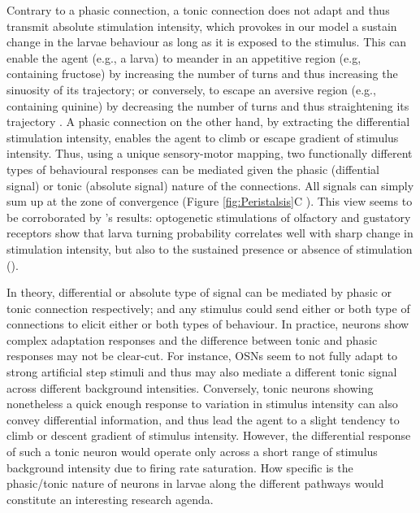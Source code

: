 \documentclass[11pt,a4paper]{article}
\begin{document}
Contrary to a phasic connection, a tonic connection does not adapt and thus transmit absolute stimulation intensity, which provokes in our model a sustain change in the larvae behaviour as long as it is exposed to the stimulus. This can enable the agent (e.g., a larva) to meander in an appetitive region (e.g, containing fructose) by increasing the number of turns and thus increasing the sinuosity of its trajectory; or conversely, to escape an aversive region (e.g., containing quinine) by decreasing the number of turns and thus straightening its trajectory \citep{benhamou1989animals}. A phasic connection on the other hand, by extracting the differential stimulation intensity, enables the agent to climb or escape gradient of stimulus intensity. Thus, using a unique sensory-motor mapping, two functionally different types of behavioural responses can be mediated given the phasic (diffential signal) or tonic (absolute signal) nature of the connections. All signals can simply sum up at the zone of convergence (Figure \ref{fig:Peristalsis}C ). This view seems to be corroborated by \cite{hernandez2015reverse}'s results: optogenetic stimulations of olfactory and gustatory receptors show that larva turning probability correlates well with sharp change in stimulation intensity, but also to the sustained presence or absence of stimulation (\citep{gepner2015computations,hernandez2015reverse}).


In theory, differential or absolute type of signal can be mediated by phasic or tonic connection respectively; and any stimulus could send either or both type of connections to elicit either or both types of behaviour. In practice, neurons show complex adaptation responses and the difference between tonic and phasic responses may not be clear-cut. For instance, OSNs seem to not fully adapt to strong artificial step stimuli \citep{nagel2011biophysical, schulze2015dynamical} and thus may also mediate a different tonic signal across different background intensities. Conversely, tonic neurons showing nonetheless a quick enough response to variation in stimulus intensity can also convey differential information, and thus lead the agent to a slight tendency to climb or descent gradient of stimulus intensity. However, the differential response of such a tonic neuron would operate only across a short range of stimulus background intensity due to firing rate saturation. How specific is the phasic/tonic nature of neurons in larvae along the different pathways would constitute an interesting research agenda.
\end{document}
